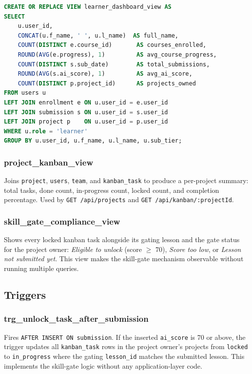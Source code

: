 \documentclass[12pt,a4paper]{article}
\begin{document}
\begin{lstlisting}[language=SQL, caption={learner\_dashboard\_view (abbreviated)}]
CREATE OR REPLACE VIEW learner_dashboard_view AS
SELECT
    u.user_id,
    CONCAT(u.f_name, ' ', u.l_name)  AS full_name,
    COUNT(DISTINCT e.course_id)       AS courses_enrolled,
    ROUND(AVG(e.progress), 1)         AS avg_course_progress,
    COUNT(DISTINCT s.sub_date)        AS total_submissions,
    ROUND(AVG(s.ai_score), 1)         AS avg_ai_score,
    COUNT(DISTINCT p.project_id)      AS projects_owned
FROM users u
LEFT JOIN enrollment e ON u.user_id = e.user_id
LEFT JOIN submission s ON u.user_id = s.user_id
LEFT JOIN project p    ON u.user_id = p.user_id
WHERE u.role = 'learner'
GROUP BY u.user_id, u.f_name, u.l_name, u.sub_tier;
\end{lstlisting}

\subsubsection{project\_kanban\_view}

Joins \texttt{project}, \texttt{users}, \texttt{team}, and \texttt{kanban\_task} to produce a
per-project summary: total tasks, done count, in-progress count, locked count, and completion
percentage. Used by \texttt{GET /api/projects} and \texttt{GET /api/kanban/:projectId}.

\subsubsection{skill\_gate\_compliance\_view}

Shows every locked kanban task alongside its gating lesson and the gate status for the project
owner: \textit{Eligible to unlock} (score $\geq$ 70), \textit{Score too low}, or
\textit{Lesson not submitted yet}. This view makes the skill-gate mechanism observable without
running multiple queries.

\subsection{Triggers}

\subsubsection{trg\_unlock\_task\_after\_submission}

Fires \texttt{AFTER INSERT ON submission}. If the inserted \texttt{ai\_score} is 70 or above,
the trigger updates all \texttt{kanban\_task} rows in the project owner's projects from
\texttt{locked} to \texttt{in\_progress} where the gating \texttt{lesson\_id} matches the
submitted lesson. This implements the skill-gate logic without any application-layer code.
\end{document}
